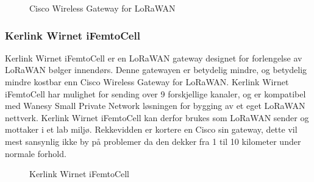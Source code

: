 \documentclass{article}
\begin{document}
\begin{figure}[!ht]
  \centering
  \caption{Cisco Wireless Gateway for LoRaWAN}
\end{figure}


\subsubsection{Kerlink Wirnet iFemtoCell}
Kerlink Wirnet iFemtoCell er en LoRaWAN gateway designet for forlengelse av LoRaWAN bølger innendørs. Denne gatewayen er betydelig mindre, og betydelig mindre kostbar enn Cisco Wireless Gateway for LoRaWAN. Kerlink Wirnet iFemtoCell har mulighet for sending over 9 forskjellige kanaler, og er kompatibel med Wanesy Small Private Network løsningen for bygging av et eget LoRaWAN nettverk. Kerlink Wirnet iFemtoCell kan derfor brukes som LoRaWAN sender og mottaker i et lab miljø. Rekkevidden er kortere en Cisco sin gateway, dette vil mest sansynlig ikke by på problemer da den dekker fra 1 til 10 kilometer under normale forhold.

\begin{figure}[!ht]
  \centering
  \caption{Kerlink Wirnet iFemtoCell}
\end{figure}
\end{document}
